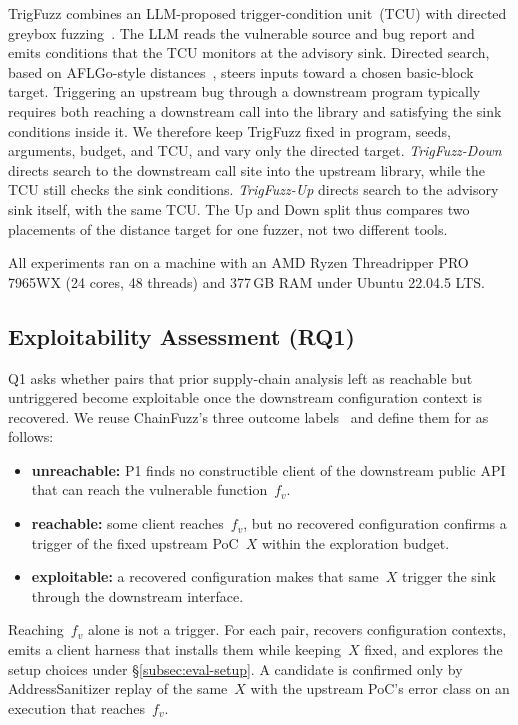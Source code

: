 TrigFuzz combines an LLM-proposed trigger-condition unit~(TCU) with directed greybox fuzzing~\cite{chen2026trigfuzz}.
The LLM reads the vulnerable source and bug report and emits conditions that the TCU monitors at the advisory sink.
Directed search, based on AFLGo-style distances~\cite{bohme2017aflgo}, steers inputs toward a chosen basic-block target.
Triggering an upstream bug through a downstream program typically requires both reaching a downstream call into the library and satisfying the sink conditions inside it.
We therefore keep TrigFuzz fixed in program, seeds, arguments, budget, and TCU, and vary only the directed target.
\emph{TrigFuzz-Down} directs search to the downstream call site into the upstream library, while the TCU still checks the sink conditions.
\emph{TrigFuzz-Up} directs search to the advisory sink itself, with the same TCU.
The Up and Down split thus compares two placements of the distance target for one fuzzer, not two different tools.

All experiments ran on a machine with an AMD Ryzen Threadripper PRO 7965WX (24 cores, 48 threads) and 377\,GB RAM under Ubuntu 22.04.5 LTS.


\subsection{Exploitability Assessment (RQ1)}
\label{subsec:rq1}

Q1 asks whether pairs that prior supply-chain analysis left as reachable but untriggered become exploitable once the downstream configuration context is recovered.
We reuse ChainFuzz's three outcome labels~\cite{deng2025chainfuzz} and define them for \sys as follows:
\begin{itemize}
    \setlength\itemsep{0.2em}
    \item \textbf{unreachable:} P1 finds no constructible client of the downstream public API that can reach the vulnerable function~$f_v$.
    \item \textbf{reachable:} some client reaches~$f_v$, but no recovered configuration confirms a trigger of the fixed upstream PoC~$X$ within the exploration budget.
    \item \textbf{exploitable:} a recovered configuration makes that same~$X$ trigger the sink through the downstream interface.
\end{itemize}
Reaching~$f_v$ alone is not a trigger.
For each pair, \sys recovers configuration contexts, emits a client harness that installs them while keeping~$X$ fixed, and explores the setup choices under \S\ref{subsec:eval-setup}.
A candidate is confirmed only by AddressSanitizer replay of the same~$X$ with the upstream PoC's error class on an execution that reaches~$f_v$.

